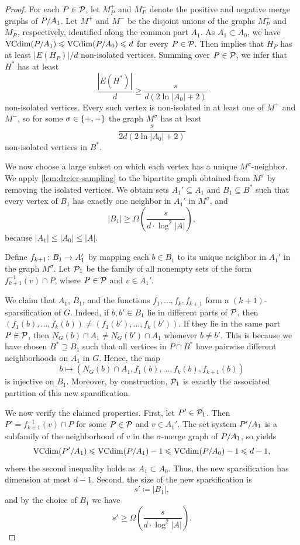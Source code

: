 \begin{proof}
For each $P\in\cal P$, let $M_P^+$ and $M_P^-$ denote the positive and
negative merge graphs of $\inducedSS{P}{A_1}$.
Let $M^+$ and $M^-$ be the disjoint unions of the graphs
$M_P^+$ and $M_P^-$, respectively, identified along the common part $A_1$.
As $A_1\subset A_0$,
 we have $\VCdim(\inducedSS{P}{A_1})\le \VCdim(\inducedSS{P}{A_0})\le d$ for every $P\in\cal P$.
Then  implies that $H_P$ has at least $|E(H_P)|/d$
non-isolated vertices.
Summing over $P\in\cal P$, we infer that $H^*$ has at least
\[
  \frac{|E(H^*)|}{d}
  \ge \frac{s}{d(2\ln |A_0|+2)}
\]
non-isolated vertices.
Every such vertex is non-isolated in at least one
of $M^+$ and $M^-$, so for some $\sigma\in\set{+,-}$ the graph $M^\sigma$
has at least
\begin{equation}\label{eq:step-many-nonis}
  \frac{s}{2d(2\ln |A_0|+2)}
\end{equation}
non-isolated vertices in $B^*$.

We now choose a large subset on which each vertex has a unique
$M^\sigma$-neighbor.
We apply \cref{lem:dreier-sampling} to the bipartite graph obtained
from $M^\sigma$ by removing the isolated vertices. %
We obtain sets $A_1'\subseteq A_1$ and $B_1\subseteq B^*$ such that every
vertex of $B_1$ has exactly one neighbor in $A_1'$ in $M^\sigma$, and
\[
  |B_1|
  \ge \Omega\left(\frac{s}{d\cdot \log^2|A|}\right),
\]
because $|A_1|\le |A_0|\le |A|$.

Define $f_{k+1}\from B_1\to A_1'$ by mapping each $b\in B_1$ to its unique
neighbor in $A_1'$ in the graph $M^\sigma$.
Let $\cal P_1$ be the family of all nonempty sets of the form
$f_{k+1}^{-1}(v)\cap P$, where $P\in\cal P$ and $v\in A_1'$.

We claim that $A_1$, $B_1$, and the functions
$f_1,\ldots,f_k,f_{k+1}$ form a $(k+1)$-sparsification of $G$.
Indeed, if $b,b'\in B_1$ lie in different parts of $\cal P$, then
$(f_1(b),\ldots,f_k(b))\neq (f_1(b'),\ldots,f_k(b'))$.
If they lie in the same part $P\in\cal P$, then 
$N_G(b)\cap A_1\neq N_G(b')\cap A_1$ whenever $b\neq b'$.
This is because we have chosen $B^* \supseteq B_1$ such that all vertices in $P \cap B^*$ have pairwise different neighborhoods on $A_1$ in $G$.
Hence, the map
\[
  b\mapsto (N_G(b)\cap A_1,f_1(b),\ldots,f_k(b),f_{k+1}(b))
\]
is injective on $B_1$.
Moreover, by construction, $\cal P_1$ is exactly the associated partition of
this new sparsification.

We now verify the claimed properties.
First, let $P'\in\cal P_1$.
Then $P'=f_{k+1}^{-1}(v)\cap P$ for some $P\in\cal P$ and $v\in A_1'$.
The set system $\inducedSS{P'}{A_1}$ is a subfamily of the neighborhood of $v$
in the $\sigma$-merge graph of $\inducedSS{P}{A_1}$, so
 yields
\[
  \VCdim(\inducedSS{P'}{A_1})\le \VCdim(\inducedSS{P}{A_1}) - 1 \le \VCdim(\inducedSS{P}{A_0}) - 1 \le d-1,
\]
where the second inequality holds as $A_1\subset A_0$.
Thus, the new sparsification has dimension at most $d-1$.
Second, the size of the new sparsification is
\[
  s'\coloneqq |B_1|,
\]
and by the choice of $B_1$ we have
\[
  s' \ge \Omega\left(\frac{s}{d\cdot \log^2|A|}\right).
\]


\end{proof}
